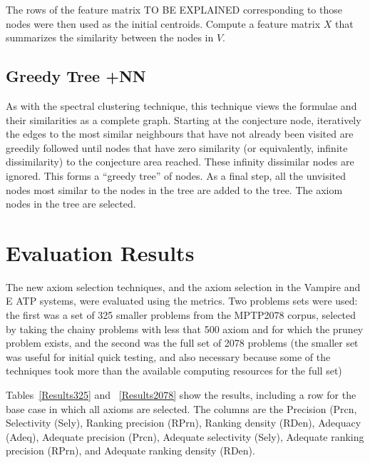 \documentclass[EPiC]{easychair}
\begin{document}
The rows of the feature matrix TO BE EXPLAINED corresponding to those
nodes were then used as the initial centroids.
Compute a feature matrix $X$ that summarizes the similarity between 
      the nodes in $V$.

\subsection{Greedy Tree +NN}
\label{Zihao}

As with the spectral clustering technique, this technique views the formulae
and their similarities as a complete graph.
Starting at the conjecture node, iteratively the edges to the most similar
neighbours that have not already been visited are greedily followed until 
nodes that have zero similarity (or equivalently, infinite dissimilarity) 
to the conjecture area reached.
These infinity dissimilar nodes are ignored.
This forms a ``greedy tree'' of nodes.
As a final step, all the unvisited nodes most similar to the nodes in the tree
are added to the tree.
The axiom nodes in the tree are selected.

\section{Evaluation Results}
\label{Results}

The new axiom selection techniques, and the axiom selection in the Vampire 
and E ATP systems, were evaluated using the metrics.
Two problems sets were used: the first was a set of 325 smaller problems
from the MPTP2078 corpus, selected by taking the chainy problems with less
that 500 axiom and for which the pruney problem exists, and the second was
the full set of 2078 problems (the smaller set was useful for initial
quick testing, and also necessary because some of the techniques took
more than the available computing resources for the full set)

Tables~\ref{Results325} and ~\ref{Results2078} show the results, including
a row for the base case in which all axioms are selected.
The columns are the 
Precision (Prcn, 
Selectivity (Sely), 
Ranking precision (RPrn), 
Ranking density (RDen), 
Adequacy (Adeq),
Adequate precision (Prcn), Adequate selectivity (Sely), Adequate
ranking precision (RPrn), and Adequate ranking density (RDen).
\end{document}
